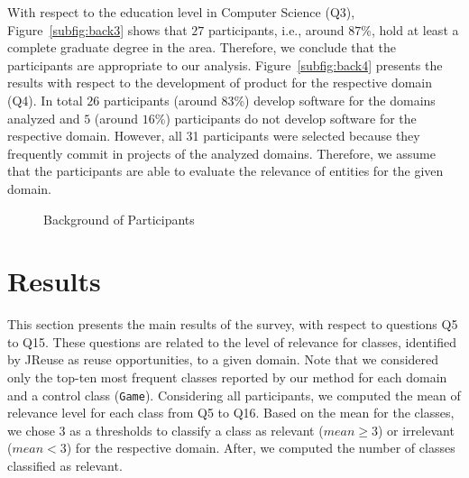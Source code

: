 With respect to the education level in Computer Science (Q3), Figure~\ref{subfig:back3} shows that $27$ participants, i.e., around $87$\%, hold at least a complete graduate degree in the area. Therefore, we conclude that the participants are appropriate to our analysis.  Figure~\ref{subfig:back4} presents the results with respect to the development of product for the respective domain (Q4). In total $26$ participants (around $83$\%) develop software for the domains analyzed  and $5$ (around $16$\%) participants do not develop software for the respective domain. However, all 31 participants were selected because they frequently commit in projects of the analyzed domains. Therefore, we assume that the participants are able to evaluate the relevance of entities for the given domain.




\begin{figure}[!h]
\center
{}
\caption{Background of Participants}
\label{fig:background}
\end{figure}







\section{Results}
\label{ch5sc:results}

This section presents the main results of the survey, with respect to questions Q5 to Q15. These questions are related to the level of relevance for classes, identified by JReuse as reuse opportunities, to  a given domain. Note that we considered only the top-ten most frequent classes reported by our method for each domain and a control class (\texttt{Game}). Considering all participants, we computed the mean of relevance level for each class from Q5 to Q16. Based on the mean for the classes, we chose 3 as a thresholds to classify a class as relevant ($mean \geq 3$) or irrelevant ($mean < 3$) for the respective domain. After, we computed the number of classes classified as relevant.

